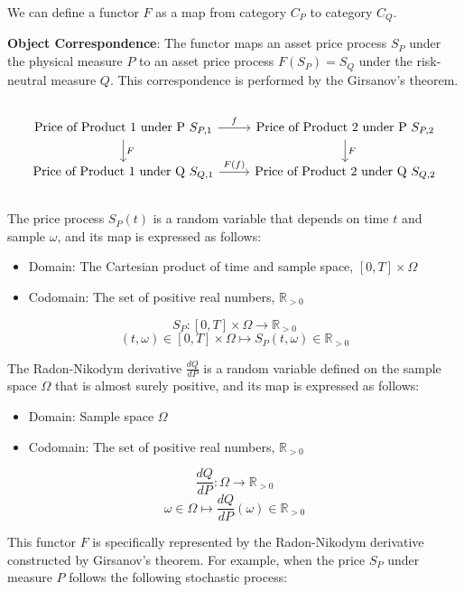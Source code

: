 \documentclass[uplatex,a4j,12pt,dvipdfmx]{jsarticle}
\begin{document}
We can define a functor $F$ as a map from category $C_{P}$ to category $C_{Q}$.

\textbf{Object Correspondence}:
The functor maps an asset price process $S_{P}$ under the physical measure $P$ to an asset price process $F(S_{P}) = S_{Q}$ under the risk-neutral measure $Q$. This correspondence is performed by the Girsanov's theorem.

${}$

$$
	\begin{tikzcd}
		\text{Price of Product 1 under P } S_{P,1} \arrow[r, "f"] \arrow[d, "F"] & \text{Price of Product 2 under P } S_{P,2} \arrow[d, "F"] \\
		\text{Price of Product 1 under Q } S_{Q,1} \arrow[r, "F(f)"] & \text{Price of Product 2 under Q } S_{Q,2}
	\end{tikzcd}
$$

${}$

The price process $S_{P}(t)$ is a random variable that depends on time $t$ and sample $\omega$, and its map is expressed as follows:

\begin{itemize}
	\item Domain: The Cartesian product of time and sample space, $[0, T] \times \Omega$
	\item Codomain: The set of positive real numbers, $\mathbb{R}_{>0}$
\end{itemize}

$$
	S_{P}: [0, T] \times \Omega \to \mathbb{R}_{>0}
$$
$$
	(t, \omega) \in [0, T] \times \Omega \mapsto S_{P}(t, \omega) \in \mathbb{R}_{>0}
$$

The Radon-Nikodym derivative $\frac{dQ}{dP}$ is a random variable defined on the sample space $\Omega$ that is almost surely positive, and its map is expressed as follows:

\begin{itemize}
	\item Domain: Sample space $\Omega$
	\item Codomain: The set of positive real numbers, $\mathbb{R}_{>0}$
\end{itemize}

$$
	\frac{dQ}{dP}: \Omega \to \mathbb{R}_{>0}
$$
$$
	\omega \in \Omega \mapsto \frac{dQ}{dP}(\omega) \in \mathbb{R}_{>0}
$$

This functor $F$ is specifically represented by the Radon-Nikodym derivative constructed by Girsanov's theorem.
For example, when the price $S_{P}$ under measure $P$ follows the following stochastic process:
\end{document}
